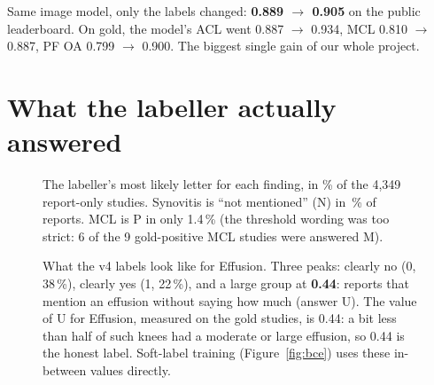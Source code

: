 \begin{innumbers}
Same image model, only the labels changed: \textbf{0.889 $\rightarrow$ 0.905} on the public leaderboard. On gold, the
model's ACL went 0.887 $\rightarrow$ 0.934, MCL 0.810 $\rightarrow$ 0.887, PF OA 0.799 $\rightarrow$ 0.900. The
biggest single gain of our whole project.
\end{innumbers}

\section{What the labeller actually answered}

\begin{figure}[H]
\centering
{}
\caption{The labeller's most likely letter for each finding, in \% of the 4,349 report-only studies. Synovitis is
``not mentioned'' (N) in \synSilent\,\% of reports. MCL is P in only 1.4\,\% (the threshold wording was too strict:
6 of the 9 gold-positive MCL studies were answered M).}
\label{fig:letterheat}
\end{figure}

\begin{figure}[H]
\centering
{}
\caption{What the v4 labels look like for Effusion. Three peaks: clearly no (0, 38\,\%), clearly yes (1, 22\,\%), and
a large group at \textbf{0.44}: reports that mention an effusion without saying how much (answer U). The value of
U for Effusion, measured on the gold studies, is 0.44: a bit less than half of such knees had a moderate or large
effusion, so 0.44 is the honest label. Soft-label training
(Figure~\ref{fig:bce}) uses these in-between values directly.}
\end{figure}

